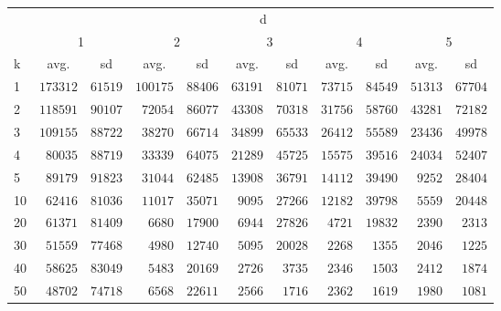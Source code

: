 \begin{landscape}
\begin{table}[H]
\renewcommand{\arraystretch}{0.85}
\begin{tabular}{lcccccccccc}
\toprule
 & \multicolumn{10}{c}{d} \\ 
 & \multicolumn{2}{c}{1} & \multicolumn{2}{c}{2} & \multicolumn{2}{c}{3} & \multicolumn{2}{c}{4} & \multicolumn{2}{c}{5} \\ 
k  & avg. & sd & avg. & sd & avg. & sd & avg. & sd & avg. & \multicolumn{1}{c}{sd} \\ 
\midrule
1  & $173312$ & $61519$ & $100175$ & $88406$ & $63191$ & $81071$ & $73715$ & $84549$ & $51313$ & $67704$ \\
2  & $118591$ & $90107$ & $\phantom{0}72054$ & $86077$ & $43308$ & $70318$ & $31756$ & $58760$ & $43281$ & $72182$ \\
3  & $109155$ & $88722$ & $\phantom{0}38270$ & $66714$ & $34899$ & $65533$ & $26412$ & $55589$ & $23436$ & $49978$ \\
4  & $\phantom{0}80035$ & $88719$ & $\phantom{0}33339$ & $64075$ & $21289$ & $45725$ & $15575$ & $39516$ & $24034$ & $52407$ \\
5  & $\phantom{0}89179$ & $91823$ & $\phantom{0}31044$ & $62485$ & $13908$ & $36791$ & $14112$ & $39490$ & $\phantom{0}9252$ & $28404$ \\
10  & $\phantom{0}62416$ & $81036$ & $\phantom{0}11017$ & $35071$ & $\phantom{0}9095$ & $27266$ & $12182$ & $39798$ & $\phantom{0}5559$ & $20448$ \\
20  & $\phantom{0}61371$ & $81409$ & $\phantom{00}6680$ & $17900$ & $\phantom{0}6944$ & $27826$ & $\phantom{0}4721$ & $19832$ & $\phantom{0}2390$ & $\phantom{0}2313$ \\
30  & $\phantom{0}51559$ & $77468$ & $\phantom{00}4980$ & $12740$ & $\phantom{0}5095$ & $20028$ & $\phantom{0}2268$ & $\phantom{0}1355$ & $\phantom{0}2046$ & $\phantom{0}1225$ \\
40  & $\phantom{0}58625$ & $83049$ & $\phantom{00}5483$ & $20169$ & $\phantom{0}2726$ & $\phantom{0}3735$ & $\phantom{0}2346$ & $\phantom{0}1503$ & $\phantom{0}2412$ & $\phantom{0}1874$ \\
50  & $\phantom{0}48702$ & $74718$ & $\phantom{00}6568$ & $22611$ & $\phantom{0}2566$ & $\phantom{0}1716$ & $\phantom{0}2362$ & $\phantom{0}1619$ & $\phantom{0}1980$ & $\phantom{0}1081$ \\
\bottomrule
\end{tabular}
\end{table}


	
\end{landscape}
\clearpage

